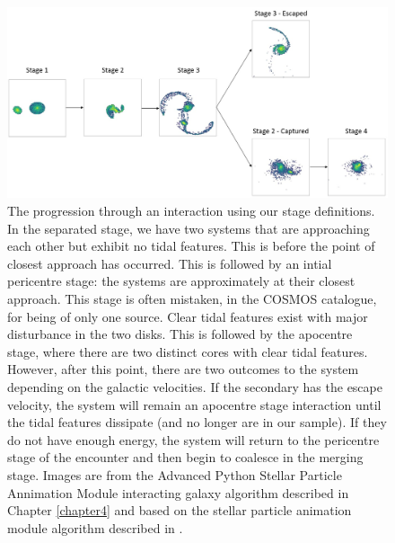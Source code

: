 \begin{figure}
    \centering
    \includegraphics[width=\textwidth]{Chapter3/figures/stage-evolution.jpg}
    \caption[The progression through an interaction using our stage definitions.]{The progression through an interaction using our stage definitions. In the separated stage, we have two systems that are approaching each other but exhibit no tidal features. This is before the point of closest approach has occurred. This is followed by an intial pericentre stage: the systems are approximately at their closest approach. This stage is often mistaken, in the COSMOS catalogue, for being of only one source. Clear tidal features exist with major disturbance in the two disks. This is followed by the apocentre stage, where there are two distinct cores with clear tidal features. However, after this point, there are two outcomes to the system depending on the galactic velocities. If the secondary has the escape velocity, the system will remain an apocentre stage interaction until the tidal features dissipate (and no longer are in our sample). If they do not have enough energy, the system will return to the pericentre stage of the encounter and then begin to coalesce in the merging stage. Images are from the Advanced Python Stellar Particle Annimation Module interacting galaxy algorithm described in Chapter \ref{chapter4} and based on the stellar particle animation module algorithm described in \citet{2016A&C....16...26W}.}
    \label{fig:illustration}
\end{figure}

